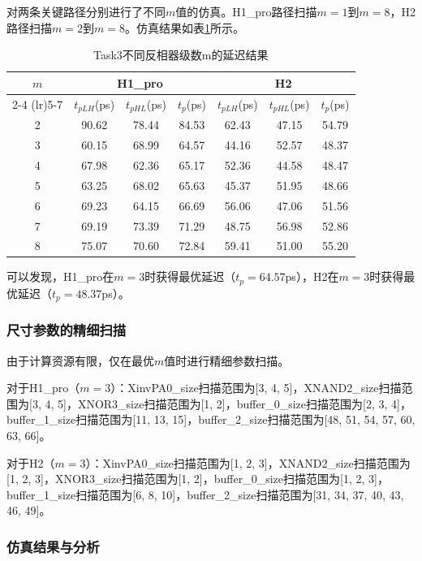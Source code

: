 \documentclass[UTF8,12pt,a4paper]{ctexart}
\begin{document}
对两条关键路径分别进行了不同$m$值的仿真。H1\_pro路径扫描$m = 1$到$m = 8$，H2路径扫描$m = 2$到$m = 8$。仿真结果如表\ref{tab:task3_m}所示。

\begin{table}[htbp]
\centering
\caption{Task3不同反相器级数m的延迟结果}
\label{tab:task3_m}
\begin{tabular}{ccccccc}
\toprule
$m$ & \multicolumn{3}{c}{H1\_pro} & \multicolumn{3}{c}{H2} \\
\cmidrule(lr){2-4} \cmidrule(lr){5-7}
 & $t_{pLH}$(ps) & $t_{pHL}$(ps) & $t_p$(ps) & $t_{pLH}$(ps) & $t_{pHL}$(ps) & $t_p$(ps) \\
\midrule
2 & 90.62 & 78.44 & 84.53 & 62.43 & 47.15 & 54.79 \\
3 & 60.15 & 68.99 & 64.57 & 44.16 & 52.57 & 48.37 \\
4 & 67.98 & 62.36 & 65.17 & 52.36 & 44.58 & 48.47 \\
5 & 63.25 & 68.02 & 65.63 & 45.37 & 51.95 & 48.66 \\
6 & 69.23 & 64.15 & 66.69 & 56.06 & 47.06 & 51.56 \\
7 & 69.19 & 73.39 & 71.29 & 48.75 & 56.98 & 52.86 \\
8 & 75.07 & 70.60 & 72.84 & 59.41 & 51.00 & 55.20 \\
\bottomrule
\end{tabular}
\end{table}

可以发现，H1\_pro在$m = 3$时获得最优延迟（$t_p = 64.57$ps），H2在$m = 3$时获得最优延迟（$t_p = 48.37$ps）。

\subsubsection{尺寸参数的精细扫描}

由于计算资源有限，仅在最优$m$值时进行精细参数扫描。

对于H1\_pro（$m = 3$）：XinvPA0\_size扫描范围为[3, 4, 5]，XNAND2\_size扫描范围为[3, 4, 5]，XNOR3\_size扫描范围为[1, 2]，buffer\_0\_size扫描范围为[2, 3, 4]，buffer\_1\_size扫描范围为[11, 13, 15]，buffer\_2\_size扫描范围为[48, 51, 54, 57, 60, 63, 66]。

对于H2（$m = 3$）：XinvPA0\_size扫描范围为[1, 2, 3]，XNAND2\_size扫描范围为[1, 2, 3]，XNOR3\_size扫描范围为[1, 2]，buffer\_0\_size扫描范围为[1, 2, 3]，buffer\_1\_size扫描范围为[6, 8, 10]，buffer\_2\_size扫描范围为[31, 34, 37, 40, 43, 46, 49]。

\subsubsection{仿真结果与分析}
\end{document}
